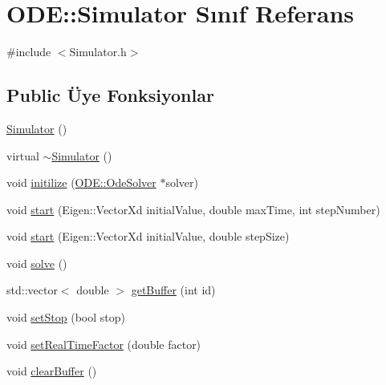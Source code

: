 \hypertarget{classODE_1_1Simulator}{}\section{O\+DE\+::Simulator Sınıf Referans}
\label{classODE_1_1Simulator}


{\ttfamily \#include $<$Simulator.\+h$>$}

\subsection*{Public Üye Fonksiyonlar}
\begin{DoxyCompactItemize}
\item 
\mbox{\hyperlink{classODE_1_1Simulator_a5cb39d33919e0f4abf174c161b807ac0}{Simulator}} ()
\item 
virtual \mbox{\hyperlink{classODE_1_1Simulator_ac6e7a52f1089f80e75db50bf23f8ebbf}{$\sim$\+Simulator}} ()
\item 
void \mbox{\hyperlink{classODE_1_1Simulator_a7bbbc67c84f201530d033c41c8904dfc}{initilize}} (\mbox{\hyperlink{classODE_1_1OdeSolver}{O\+D\+E\+::\+Ode\+Solver}} $\ast$solver)
\item 
void \mbox{\hyperlink{classODE_1_1Simulator_a39b9e5d9c43f4fa61ec77f8904bae16c}{start}} (Eigen\+::\+Vector\+Xd initial\+Value, double max\+Time, int step\+Number)
\item 
void \mbox{\hyperlink{classODE_1_1Simulator_a07006cb053265d3b00dc7228a9eee61f}{start}} (Eigen\+::\+Vector\+Xd initial\+Value, double step\+Size)
\item 
void \mbox{\hyperlink{classODE_1_1Simulator_ad4920d85e6eb7a6b3cff94caec6d25b6}{solve}} ()
\item 
std\+::vector$<$ double $>$ \mbox{\hyperlink{classODE_1_1Simulator_a57d62688ddf187773cc7b05bf28ac98f}{get\+Buffer}} (int id)
\item 
void \mbox{\hyperlink{classODE_1_1Simulator_aa958dd517b143914e9153e74311081bb}{set\+Stop}} (bool stop)
\item 
void \mbox{\hyperlink{classODE_1_1Simulator_af6b7440aa63e459ae6bd89e89af6f8aa}{set\+Real\+Time\+Factor}} (double factor)
\item 
void \mbox{\hyperlink{classODE_1_1Simulator_ac862b28aefa74dff04ed10f824eed99f}{clear\+Buffer}} ()
\end{DoxyCompactItemize}
